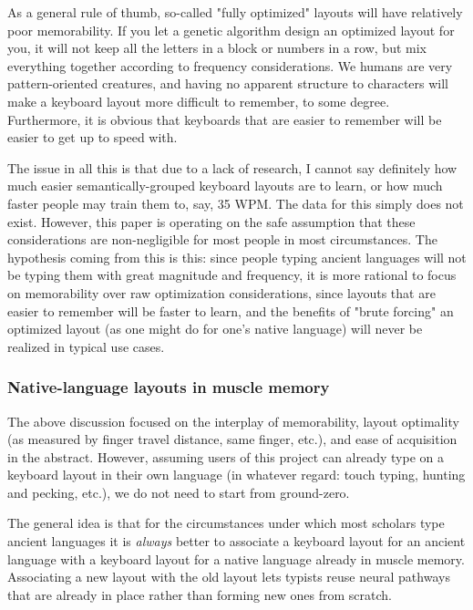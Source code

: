 \documentclass[11pt]{article}
\begin{document}
As a general rule of thumb, so-called "fully optimized" layouts will have relatively poor memorability. If you let a genetic algorithm design an optimized layout for you, it will not keep all the letters in a block or numbers in a row, but mix everything together according to frequency considerations. We humans are very pattern-oriented creatures, and having no apparent structure to characters will make a keyboard layout more difficult to remember, to some degree. Furthermore, it is obvious that keyboards that are easier to remember will be easier to get up to speed with.

The issue in all this is that due to a lack of research, I cannot say definitely how much easier semantically-grouped keyboard layouts are to learn, or how much faster people may train them to, say, 35 WPM. The data for this simply does not exist. However, this paper is operating on the safe assumption that these considerations are non-negligible for most people in most circumstances. The hypothesis coming from this is this: since people typing ancient languages will not be typing them with great magnitude and frequency, it is more rational to focus on memorability over raw optimization considerations, since layouts that are easier to remember will be faster to learn, and the benefits of "brute forcing" an optimized layout (as one might do for one's native language) will never be realized in typical use cases.

\subsubsection{Native-language layouts in muscle memory}
\label{sec:orgfcc9344}

The above discussion focused on the interplay of memorability, layout optimality (as measured by finger travel distance, same finger, etc.), and ease of acquisition in the abstract. However, assuming users of this project can already type on a keyboard layout in their own language (in whatever regard: touch typing, hunting and pecking, etc.), we do not need to start from ground-zero.

The general idea is that for the circumstances under which most scholars type ancient languages it is \emph{always} better to associate a keyboard layout for an ancient language with a keyboard layout for a native language already in muscle memory. Associating a new layout with the old layout lets typists reuse neural pathways that are already in place rather than forming new ones from scratch.
\end{document}
